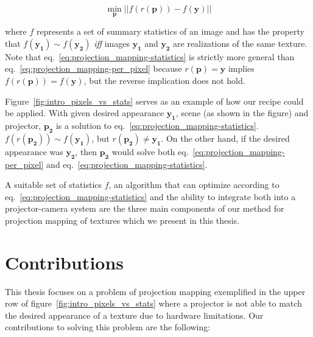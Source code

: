 \begin{equation}
    \label{eq:projection_mapping-statistics}
    \min_{\bm{p}} || f(r(\bm{p})) - f(\bm{y}) ||
\end{equation}

where \(f\) represents a set of summary statistics of an image and has the property that \(f(\bm{y_1}) \sim f(\bm{y_2})\) \textit{iff} images \(\bm{y_1}\) and \(\bm{y_2}\) are realizations of the same texture. Note that eq.~\ref{eq:projection_mapping-statistics} is strictly more general than eq.~\ref{eq:projection_mapping-per_pixel} because \(r(\bm{p}) = \bm{y}\) implies \(f(r(\bm{p})) = f(\bm{y})\), but the reverse implication does not hold.

Figure~\ref{fig:intro_pixels_vs_stats} serves as an example of how our recipe could be applied. With given desired appearance \(\bm{y_1}\), scene (as shown in the figure) and projector, \(\bm{p_2}\) is a solution to eq.~\ref{eq:projection_mapping-statistics}. \(f(r(\bm{p_2})) \sim f(\bm{y_1})\), but \(r(\bm{p_2}) \neq \bm{y_1}\). On the other hand, if the desired appearance was \(\bm{y_2}\), then \(\bm{p_2}\) would solve both eq.~\ref{eq:projection_mapping-per_pixel} and eq.~\ref{eq:projection_mapping-statistics}.

A suitable set of statistics \(f\), an algorithm that can optimize according to eq.~\ref{eq:projection_mapping-statistics} and the ability to integrate both into a projector-camera system are the three main components of our method for projection mapping of textures which we present in this thesis.

\section{Contributions}
\label{section:intro-contributions}

This thesis focuses on a problem of projection mapping exemplified in the upper row of figure~\ref{fig:intro_pixels_vs_stats} where a projector is not able to match the desired appearance of a texture due to hardware limitations. Our contributions to solving this problem are the following:

